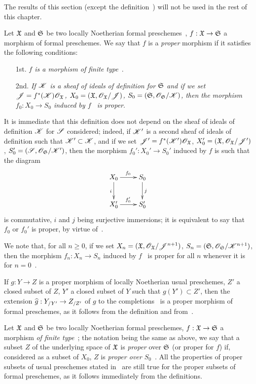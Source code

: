 The results of this section (except the definition~) will not be used in the rest of this chapter.

\begin{env}[3.4.1]
\label{3.3.4.1}
Let $\mathfrak{X}$ and $\mathfrak{S}$ be two locally Noetherian formal preschemes~, $f:\fk{X}\to\fk{S}$ a morphism of formal preschemes.
We say that $f$ is a \emph{proper} morphism if it satisfies the following conditions:
\begin{enumerate}
  \item[1st.] \emph{$f$ is a morphism of finite type~}.
  \item[2nd.] \emph{If $\mathscr{K}$ is a sheaf of ideals of definition for $\mathfrak{S}$ and if we set $\mathscr{J}=f^*(\mathscr{K})\mathscr{O}_\mathfrak{X}$, $X_0=(\mathfrak{X},\mathscr{O}_\mathfrak{X}/\mathscr{J})$, $S_0=(\mathfrak{S},\mathscr{O}_\mathfrak{S}/\mathscr{K})$, then the morphism $f_0:X_0\to S_0$ induced by $f$~ is proper}.
\end{enumerate}
It is immediate that this definition does not depend on the sheaf of ideals of definition $\mathscr{K}$ for $\mathscr{S}$ considered; indeed, if $\mathscr{K}'$ is a second sheaf of ideals of definition such that $\mathscr{K}'\subset\mathscr{K}$, and if we set $\mathscr{J}'=f^*(\mathscr{K}')\mathscr{O}_\mathfrak{X}$, $X_0'=(\mathfrak{X},\mathscr{O}_\mathfrak{X}/\mathscr{J}')$, $S_0'=(\mathscr{S},\mathscr{O}_\mathfrak{S}/\mathscr{K}')$, then the morphism $f_0':X_0'\to S_0'$ induced by $f$ is such that the diagram
\[
  \xymatrix{
    X_0\ar[r]^{f_0}\ar[d]_i &
    S_0\ar[d]^j\\
    X_0'\ar[r]^{f_0'} &
    S_0'
  }
\]
is commutative, $i$ and $j$ being surjective immersions; it is equivalent to say that $f_0$ or $f_0'$ is proper, by virtue of~.

We note that, for all $n\geq 0$, if we set $X_n=(\mathfrak{X},\mathscr{O}_\mathfrak{X}/\mathscr{J}^{n+1})$, $S_n=(\mathfrak{S},\mathscr{O}_\mathfrak{S}/\mathscr{K}^{n+1})$, then the morphism $f_n:X_n\to S_n$ induced by $f$~ is proper for all $n$ whenever it is for $n=0$~.

If $g:Y\to Z$ is a proper morphism of locally Noetherian usual preschemes, $Z'$ a closed subset of $Z$, $Y'$ a closed subset of $Y$ such that $g(Y')\subset Z'$, then the extension $\wh{g}:Y_{/Y'}\to Z_{/Z'}$ of $g$ to the completions~ is a proper morphism of formal preschemes, as it follows from the definition and from~.

Let $\mathfrak{X}$ and $\mathfrak{S}$ be two locally Noetherian formal preschemes, $f:\fk{X}\to\fk{S}$ a morphism \emph{of finite type}~; the notation being the same as above, we say that a subset $Z$ of the underlying space of $\mathfrak{X}$ is \emph{proper} over $\mathfrak{S}$ (or proper for $f$) if, considered as a subset of $X_0$, $Z$ is \emph{proper over $S_0$}~.
All the properties of proper subsets of usual preschemes stated in~ are still true for the proper subsets of formal preschemes, as it follows immediately from the definitions.
\end{env}

